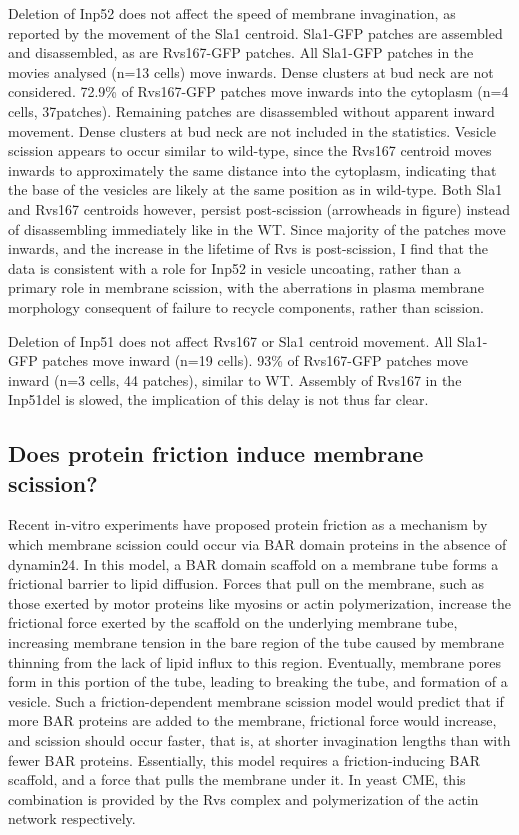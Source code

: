 	\vspace{5mm}
	Deletion of Inp52 does not affect the speed of membrane invagination, as reported by the movement of the Sla1 centroid. Sla1-GFP patches are assembled and disassembled, as are Rvs167-GFP patches. All Sla1-GFP patches in the movies analysed (n=13 cells) move inwards.  Dense clusters at bud neck are not considered. 72.9\% of Rvs167-GFP patches move inwards into the cytoplasm (n=4 cells, 37patches). Remaining patches are disassembled without apparent inward movement. Dense clusters at bud neck are not included in the statistics. Vesicle scission appears to occur similar to wild-type, since the Rvs167 centroid moves inwards to approximately the same distance into the cytoplasm, indicating that the base of the vesicles are likely at the same position as in wild-type. Both Sla1 and Rvs167 centroids however, persist post-scission (arrowheads in figure) instead of disassembling immediately like in the WT. Since majority of the patches move inwards, and the increase in the lifetime of Rvs is post-scission, I find that the data is consistent with a role for Inp52 in vesicle uncoating, rather than a primary role in membrane scission, with the aberrations in plasma membrane morphology consequent of failure to recycle components, rather than scission. 
	


	\vspace{5mm}
	Deletion of Inp51 does not affect Rvs167 or Sla1 centroid movement. All Sla1-GFP patches move inward (n=19 cells). 93\% of Rvs167-GFP patches move inward (n=3 cells, 44 patches), similar to WT. Assembly of Rvs167 in the Inp51del is slowed, the implication of this delay is not thus far clear. 


	
	\subsection{Does protein friction induce membrane scission? }
	
	Recent in-vitro experiments have proposed protein friction as a mechanism by which membrane scission could occur via BAR domain proteins in the absence of dynamin24. In this model, a BAR domain scaffold on a membrane tube forms a frictional barrier to lipid diffusion. Forces that pull on the membrane, such as those exerted by motor proteins like myosins or actin polymerization, increase the frictional force exerted by the scaffold on the underlying membrane tube, increasing membrane tension in the bare region of the tube caused by membrane thinning from the lack of lipid influx to this region. Eventually, membrane pores form in this portion of the tube, leading to breaking the tube, and formation of a vesicle. Such a friction-dependent membrane scission model would predict that if more BAR proteins are added to the membrane, frictional force would increase, and scission should occur faster, that is, at shorter invagination lengths than with fewer BAR proteins. Essentially, this model requires a friction-inducing BAR scaffold, and a force that pulls the membrane under it. In yeast CME, this combination is provided by the Rvs complex and polymerization of the actin network respectively. 
	

